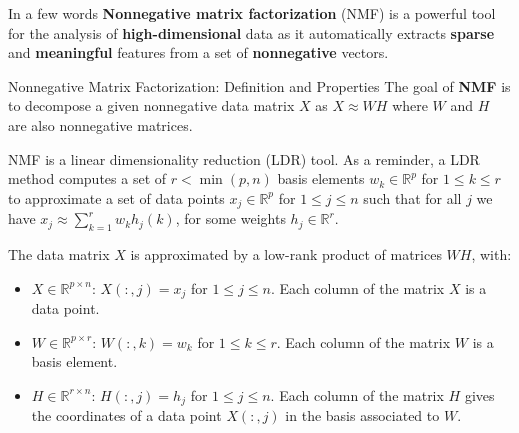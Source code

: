 \documentclass[final]{beamer}
\newlength{\threecolwid}
\newcommand{\real}{\mathbb{R}}
\begin{document}
\begin{frame}
\begin{columns}[t]
\begin{column}{\threecolwid}
\begin{alertblock}{In a few words}
\normalsize
\textbf{Nonnegative matrix factorization} (NMF) is a powerful tool for the analysis of \textbf{high-dimensional} data as it automatically extracts \textbf{sparse} and \textbf{meaningful} features from a set of \textbf{nonnegative} vectors.
\end{alertblock}


\begin{exampleblock}{Nonnegative Matrix Factorization: Definition and Properties}
The goal of \textbf{NMF} is to decompose a given nonnegative data matrix $X$ as $X \approx W H$ where $W$ and $H$ are also nonnegative matrices.

NMF is a linear dimensionality reduction (LDR) tool. As a reminder, a LDR method computes a set of $r < \min(p,n)$ basis elements $w_k \in \real^p$ for $1 \leqslant k \leqslant r$ to approximate a set of data points $x_j \in \real^{p}$ for $1 \leqslant j \leqslant n$ such that for all $j$ we have $x_j \approx \sum_{k = 1}^{r} w_{k} h_{j}(k)$, for some weights $h_j\in \real^r$.

The data matrix $X$ is approximated by a low-rank product of matrices $WH$, with:
     \begin{itemize}
     \item $X \in \real^{p \times n}$: $X(:,j) = x_j$ for $1 \leqslant j \leqslant n$. Each column of the matrix $X$ is a data point.
     \item $W \in \real^{p \times r}$: $W(:,k) = w_k$ for $1 \leqslant k \leqslant r$. Each column of the matrix $W$ is a basis element.
     \item $H \in \real^{r \times n}$: $H(:,j) = h_j$ for $1 \leqslant j \leqslant n$. Each column of the matrix \(H\) gives the coordinates of a data point \(X(:,j)\) in the basis associated to \(W\).
     \end{itemize}
\end{exampleblock}





\end{column}
\end{columns}
\end{frame}
\end{document}
